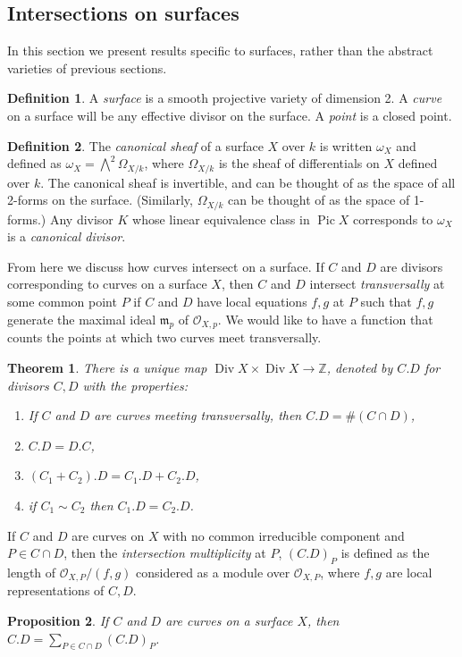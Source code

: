 \documentclass[12pt,twoside]{reedthesis}
\theoremstyle{plain}
\newtheorem{theorem}{Theorem}[chapter]
\newtheorem{proposition}[theorem]{Proposition}
\theoremstyle{definition}
\newtheorem{definition}{Definition}[section]
\theoremstyle{remark}
\newcommand{\ZZ}{\mathbb{Z}}
\newcommand{\calO}{\mathcal{O}}
\newcommand{\Div}{\operatorname{Div}}
\newcommand{\Pic}{\operatorname{Pic}}
\begin{document}
\subsection{Intersections on surfaces}
In this section we present results specific to surfaces, rather than the abstract varieties of previous sections.
\begin{definition}
A \emph{surface} is a smooth projective variety of dimension 2. A \emph{curve} on a surface will be any effective divisor on the surface. A \emph{point} is a closed point.
\end{definition}
\begin{definition}
The \emph{canonical sheaf} of a surface $X$ over $k$ is written $\omega_X$ and defined as $\omega_X=\bigwedge^2\Omega_{X/k}$, where $\Omega_{X/k}$ is the sheaf of differentials on $X$ defined over $k$. The canonical sheaf is invertible, and can be thought of as the space of all 2-forms on the surface. (Similarly, $\Omega_{X/k}$ can be thought of as the space of 1-forms.) Any divisor $K$ whose linear equivalence class in $\Pic X$ corresponds to $\omega_X$ is a \emph{canonical divisor}.
\end{definition}
From here we discuss how curves intersect on a surface. If $C$ and $D$ are divisors corresponding to curves on a surface $X$, then $C$ and $D$ intersect \emph{transversally} at some common point $P$ if $C$ and $D$ have local equations $f,g$ at $P$ such that $f,g$ generate the maximal ideal $\mathfrak{m}_p$ of $\calO_{X,p}$. We would like to have a function that counts the points at which two curves meet transversally.
\begin{theorem}
There is a unique map $\Div X\times \Div X\to\ZZ$, denoted by $C.D$ for divisors $C,D$ with the properties:
\begin{enumerate}
\item If $C$ and $D$ are curves meeting transversally, then $C.D=\#(C\cap D)$,
\item $C.D=D.C$,
\item $(C_1+C_2).D=C_1.D+C_2.D$,
\item if $C_1\sim C_2$ then $C_1.D=C_2.D$.
\end{enumerate}
\end{theorem}
\noindent If $C$ and $D$ are curves on $X$ with no common irreducible component and $P\in C\cap D$, then the \emph{intersection multiplicity} at $P$, $(C.D)_P$ is defined as the length of $\calO_{X,P}/(f,g)$ considered as a module over $\calO_{X,P}$, where $f,g$ are local representations of $C,D$.
\begin{proposition}
 If $C$ and $D$ are curves on a surface $X$, then $C.D=\sum_{P\in C\cap D} (C.D)_P$.
\end{proposition}
\end{document}
